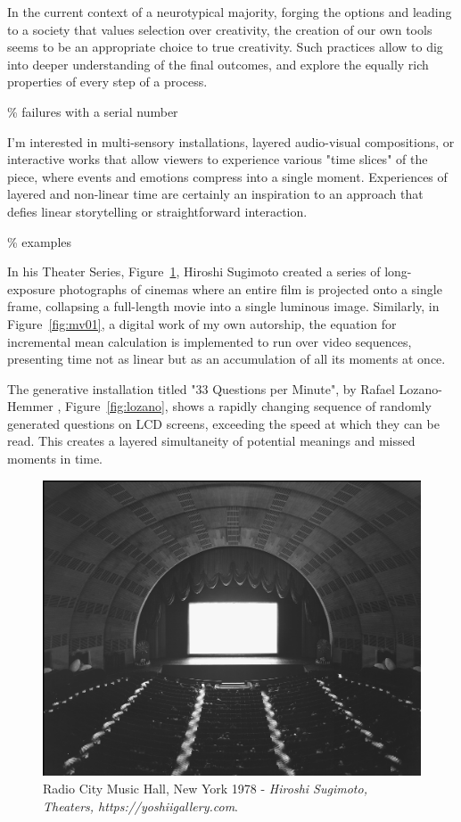 In the current context of a neurotypical majority, forging the options and leading to a society that values selection over creativity, the creation of our own tools seems to be an appropriate choice to true creativity. Such practices allow to dig into deeper understanding of the final outcomes, and explore the equally rich properties of every step of a process.   

{\scriptsize \textcolor{comment}{\% failures with a serial number}}


I'm interested in multi-sensory installations, layered audio-visual compositions, or interactive works that allow viewers to experience various "time slices" of the piece, where events and emotions compress into a single moment. Experiences of layered and non-linear time are certainly an inspiration to an approach that defies linear storytelling or straightforward interaction.

{\scriptsize \textcolor{comment}{\% examples}}

In his Theater Series, Figure~\ref{fig:sugimoto}, Hiroshi Sugimoto \citep{sugimotohiroshi} created a series of long-exposure photographs of cinemas where an entire film is projected onto a single frame, collapsing a full-length movie into a single luminous image. Similarly, in Figure~\ref{fig:mv01}, a digital work of my own autorship, the equation for incremental mean calculation is implemented to run over video sequences, presenting time not as linear but as an accumulation of all its moments at once.

The generative installation titled "33 Questions per Minute", by Rafael Lozano-Hemmer \citep{lozano-hemmer}, Figure~\ref{fig:lozano}, shows a rapidly changing sequence of randomly generated questions on LCD screens, exceeding the speed at which they can be read. This creates a layered simultaneity of potential meanings and missed moments in time.

\begin{figure}
    \centering
    \includegraphics[width=0.8\linewidth]{assets/hiroshi-sugimoto-theaters-1978-1993-Radio-City-Music-Hall-1.png} 
    \caption{\small  Radio City Music Hall, New York 1978 - \textit{Hiroshi Sugimoto, Theaters, https://yoshiigallery.com}.}
    \label{fig:sugimoto}
\end{figure}


